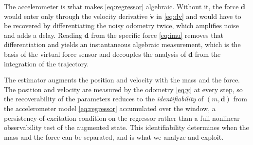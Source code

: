 \documentclass{ieeeaccess}
\newcommand{\vect}[1]{\bm{#1}}
\begin{document}
The accelerometer is what makes \eqref{eq:regressor} algebraic. Without it, the
force $\vect{d}$ would enter only through the velocity derivative
$\dot{\vect{v}}$ in \eqref{eq:dv} and would have to be recovered by
differentiating the noisy odometry twice, which amplifies noise and adds a
delay. Reading $\vect{d}$ from the specific force \eqref{eq:imu} removes that
differentiation and yields an instantaneous algebraic measurement, which is the
basis of the virtual force sensor and decouples the analysis of $\vect{d}$ from
the integration of the trajectory.

The estimator augments the position and velocity with the mass and the force.
The position and velocity are measured by the odometry \eqref{eq:y} at every step,
so the recoverability of the parameters reduces to the \emph{identifiability} of
$(m,\vect{d})$ from the accelerometer model \eqref{eq:regressor} accumulated over
the window, a persistency-of-excitation condition on the regressor rather than a
full nonlinear observability test of the augmented state. This identifiability
determines when the mass and the force can be separated, and is what we analyze
and exploit.
\end{document}
